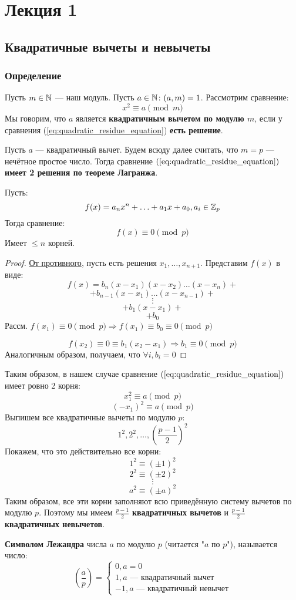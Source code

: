 \section{Лекция 1}
\subsection{Квадратичные вычеты и невычеты}
\subsubsection{Определение}
Пусть $m \in \mathbb{N}$ --- наш модуль. Пусть $a \in \mathbb{N} \colon (a, m) = 1$. Рассмотрим сравнение:
\begin{equation}
  \label{eq:quadratic_residue_equation}
x^{2} \equiv a \pmod m
\end{equation}
Мы говорим, что $a$ является \textbf{квадратичным вычетом по модулю $m$}, если у сравнения (\ref{eq:quadratic_residue_equation}) \textbf{есть решение}.

Пусть $a$ --- квадратичный вычет. Будем всюду далее считать, что $m = p$ --- нечётное простое число. Тогда сравнение $(\ref{eq:quadratic_residue_equation})$ \textbf{имеет 2 решения по теореме Лагранжа}.

\begin{theorem}[Лагранжа]
\label{theorem:01_1}
Пусть:
\[
  f(x) = a_n x^{n} + \ldots + a_1 x + a_0, a_i \in \mathbb{Z}_p
\]
Тогда сравнение:
\[
  f(x) \equiv 0 \pmod p
\]
Имеет $ \leq n$ корней.
\end{theorem}
\begin{proof}
\underline{От противного}, пусть есть решения $x_1, \ldots, x_{n + 1}$. Представим $f(x)$ в виде:
\[
  f(x) = b_n(x - x_1)(x - x_2)\ldots(x - x_n) + 
\]
\[
     +  b_{n - 1}(x - x_1)\ldots(x - x_{n - 1}) +
\]
\[
        \vdots
\]
\[
    +  b_1(x - x_1) + 
\]
\[
      + b_0
\]
Рассм. $f(x_1) \equiv 0 \pmod p \Rightarrow f(x_1) \equiv b_0 \equiv 0 \pmod p$ 

\[
f(x_2) \equiv 0 \equiv b_1(x_2 - x_1) \Rightarrow b_1 \equiv 0 \pmod p
\]
Аналогичным образом, получаем, что $\forall i, b_i = 0$
\end{proof}
Таким образом, в нашем случае сравнение $(\ref{eq:quadratic_residue_equation})$ имеет ровно 2 корня:
\[
  x_1^{2} \equiv a \pmod p
\]
\[
  (-x_1)^{2} \equiv a \pmod p
\]
Выпишем все квадратичные вычеты по модулю $p$:
\[
1^{2}, 2^{2}, \ldots, \left(\frac{p - 1}{2}\right)^{2}
\]
Покажем, что это действительно все корни:
\[
1^{2} \equiv (\pm 1)^{2}
\]
\[
2^{2} \equiv (\pm 2)^{2}
\]
\[
\vdots
\]
\[
a^{2} \equiv (\pm a)^{2}
\]
Таким образом, все эти корни заполняют всю приведённую систему вычетов по модулю $p$. Поэтому мы имеем $\frac{p - 1}{2}$ \textbf{квадратичных вычетов} и $\frac{p - 1}{2}$ \textbf{квадратичных невычетов}.
\begin{definition}
\textbf{Символом Лежандра} числа $a$ по модулю $p$ (читается "$a$ по $p$"), называется число:
\[
  \left(\frac{a}{p}\right) = \begin{cases}
  0, a = 0 \\
  1, a \text{ --- квадратичный вычет} \\
  -1, a \text{ --- квадратичный невычет}
  \end{cases}
\]
\end{definition}
